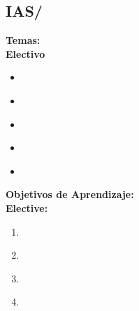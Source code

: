 \subsection{IAS/\IASWebSecurity}\label{sec:BOK:IASWebSecurity}
\noindent \textbf{Temas:}\\
\noindent \textbf{Electivo}
\begin{itemize}
	\item \IASWebSecurityTopicWeb\label{sec:BOK:IASWebSecurityTopicWeb}
	\item \IASWebSecurityTopicSession\label{sec:BOK:IASWebSecurityTopicSession}
	\item \IASWebSecurityTopicApplication\label{sec:BOK:IASWebSecurityTopicApplication}
	\item \IASWebSecurityTopicClient\label{sec:BOK:IASWebSecurityTopicClient}
	\item \IASWebSecurityTopicServer\label{sec:BOK:IASWebSecurityTopicServer}
\end{itemize}


\noindent \textbf{Objetivos de Aprendizaje:}\\
\noindent \textbf{Elective:}
\begin{enumerate}
	\setcounter{enumi}{0}
	\item \IASWebSecurityLODescribeTheModel\xspace[\IASWebSecurityLODescribeTheModelLevel]\label{sec:BOK:IASWebSecurityLODescribeTheModel}
	\item \IASWebSecurityLODiscussTheWeb\xspace[\IASWebSecurityLODiscussTheWebLevel]\label{sec:BOK:IASWebSecurityLODiscussTheWeb}
	\item \IASWebSecurityLOInvestigate\xspace[\IASWebSecurityLOInvestigateLevel]\label{sec:BOK:IASWebSecurityLOInvestigate}
	\item \IASWebSecurityLOUseClient\xspace[\IASWebSecurityLOUseClientLevel]\label{sec:BOK:IASWebSecurityLOUseClient}
\end{enumerate}


